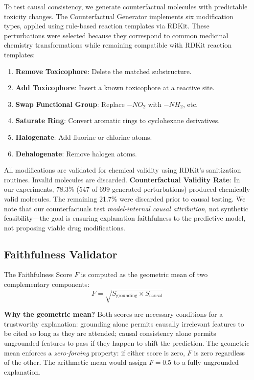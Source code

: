 \documentclass[conference]{IEEEtran}
\begin{document}
To test causal consistency, we generate counterfactual molecules with predictable toxicity changes. The Counterfactual Generator implements six modification types, applied using rule-based reaction templates via RDKit. These perturbations were selected because they correspond to common medicinal chemistry transformations while remaining compatible with RDKit reaction templates:

\begin{enumerate}
    \item \textbf{Remove Toxicophore}: Delete the matched substructure.
    \item \textbf{Add Toxicophore}: Insert a known toxicophore at a reactive site.
    \item \textbf{Swap Functional Group}: Replace $-NO_2$ with $-NH_2$, etc.
    \item \textbf{Saturate Ring}: Convert aromatic rings to cyclohexane derivatives.
    \item \textbf{Halogenate}: Add fluorine or chlorine atoms.
    \item \textbf{Dehalogenate}: Remove halogen atoms.
\end{enumerate}

All modifications are validated for chemical validity using RDKit's sanitization routines. Invalid molecules are discarded. \textbf{Counterfactual Validity Rate}: In our experiments, 78.3\% (547 of 699 generated perturbations) produced chemically valid molecules. The remaining 21.7\% were discarded prior to causal testing. We note that our counterfactuals test \textit{model-internal causal attribution}, not synthetic feasibility---the goal is ensuring explanation faithfulness to the predictive model, not proposing viable drug modifications.

\subsection{Faithfulness Validator}

The Faithfulness Score $F$ is computed as the geometric mean of two complementary components:
\begin{equation}
    F = \sqrt{S_{\text{grounding}} \times S_{\text{causal}}}
\end{equation}

\textbf{Why the geometric mean?} Both scores are necessary conditions for a trustworthy explanation: grounding alone permits causally irrelevant features to be cited so long as they are attended; causal consistency alone permits ungrounded features to pass if they happen to shift the prediction. The geometric mean enforces a \emph{zero-forcing} property: if either score is zero, $F$ is zero regardless of the other. The arithmetic mean would assign $F = 0.5$ to a fully ungrounded explanation.
\end{document}
